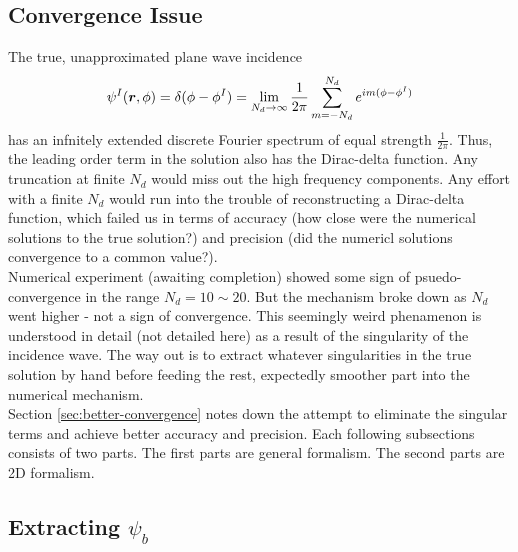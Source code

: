 \documentclass [10pt,letterpaper]{article}
\renewcommand{\vec}{\vectorsym}
\begin{document}
\subsection{Convergence Issue}
\label{sub:convergence-issue}
The true, unapproximated plane wave incidence
\begin{equation} \label{eq:harmonic-expansion-of-psiI-2d}
	\psi^I(\vec{r},\phi)
	=
	\delta(\phi-\phi^I)
	=
	\lim_{N_d \to \infty}
	\frac{1}{2\pi} 
	\sum\limits_{m=-N_d}^{N_d}
	e^{i m (\phi-\phi^I)}
\end{equation}
has an infnitely extended discrete Fourier spectrum of equal strength $\frac{1}{2\pi}$.
Thus, the leading order term in the solution also has the Dirac-delta function.
Any truncation at finite $N_d$ would miss out the high frequency components.
Any effort with a finite $N_d$ would run into the trouble of reconstructing a Dirac-delta function, 
which failed us in terms of accuracy (how close were the numerical solutions to the true solution?) and precision (did the numericl solutions convergence to a common value?).
\\
Numerical experiment (awaiting completion) showed some sign of psuedo-convergence in the range $N_d=10\sim20$. 
But the mechanism broke down as $N_d$ went higher - not a sign of convergence.
This seemingly weird phenamenon is understood in detail (not detailed here) as a result of the singularity of the incidence wave.
The way out is to extract whatever singularities in the true solution by hand before feeding the rest, expectedly smoother part into the numerical mechanism.
\\
Section \eqref{sec:better-convergence} notes down the attempt to eliminate the singular terms and achieve better accuracy and precision.
Each following subsections consists of two parts.
The first parts are general formalism.
The second parts are 2D formalism.


\subsection{Extracting $\psi_b$}
\label{sub:extracting-psib}
\end{document}
